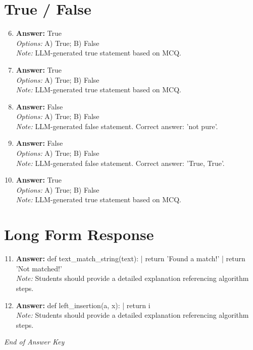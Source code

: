 \documentclass[12pt]{article}
\begin{document}
\section*{True / False}
\begin{enumerate}[label=\arabic*.]
\setcounter{enumi}{5}
\item \textbf{Answer:} True
\\ \textit{Options:} A) True; B) False
\\ \textit{Note:} LLM-generated true statement based on MCQ.
\item \textbf{Answer:} True
\\ \textit{Options:} A) True; B) False
\\ \textit{Note:} LLM-generated true statement based on MCQ.
\item \textbf{Answer:} False
\\ \textit{Options:} A) True; B) False
\\ \textit{Note:} LLM-generated false statement. Correct answer: 'not pure'.
\item \textbf{Answer:} False
\\ \textit{Options:} A) True; B) False
\\ \textit{Note:} LLM-generated false statement. Correct answer: 'True, True'.
\item \textbf{Answer:} True
\\ \textit{Options:} A) True; B) False
\\ \textit{Note:} LLM-generated true statement based on MCQ.
\end{enumerate}

\section*{Long Form Response}
\begin{enumerate}[label=\arabic*.]
\setcounter{enumi}{10}
\item \textbf{Answer:} def text\_match\_string(text): | return 'Found a match!' | return 'Not matched!'
\\ \textit{Note:} Students should provide a detailed explanation referencing algorithm steps.
\item \textbf{Answer:} def left\_insertion(a, x): | return i
\\ \textit{Note:} Students should provide a detailed explanation referencing algorithm steps.
\end{enumerate}

\vfill
\noindent\textit{End of Answer Key}
\end{document}
